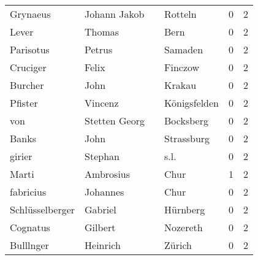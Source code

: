 \begin{center}
\begin{tiny}
\begin{longtabu}{llllrr}
                 Grynaeus &                       Johann Jakob &             &                                     Rotteln &          0 &         2 \\
                    Lever &                             Thomas &             &                                        Bern &          0 &         2 \\
                Parisotus &                             Petrus &             &                                     Samaden &          0 &         2 \\
                 Cruciger &                              Felix &             &                                     Finczow &          0 &         2 \\
                  Burcher &                               John &             &                                      Krakau &          0 &         2 \\
                  Pfister &                            Vincenz &             &                                Königsfelden &          0 &         2 \\
                      von &                      Stetten Georg &             &                                   Bocksberg &          0 &         2 \\
                    Banks &                               John &             &                                  Strassburg &          0 &         2 \\
                   girier &                            Stephan &             &                                        s.l. &          0 &         2 \\
                    Marti &                          Ambrosius &             &                                        Chur &          1 &         2 \\
                fabricius &                           Johannes &             &                                        Chur &          0 &         2 \\
          Schlüsselberger &                            Gabriel &             &                                    Hürnberg &          0 &         2 \\
                 Cognatus &                            Gilbert &             &                                    Nozereth &          0 &         2 \\
                Bulllnger &                           Heinrich &             &                                      Zürich &          0 &         2 \\

\end{longtabu}
\end{tiny}
\end{center}
